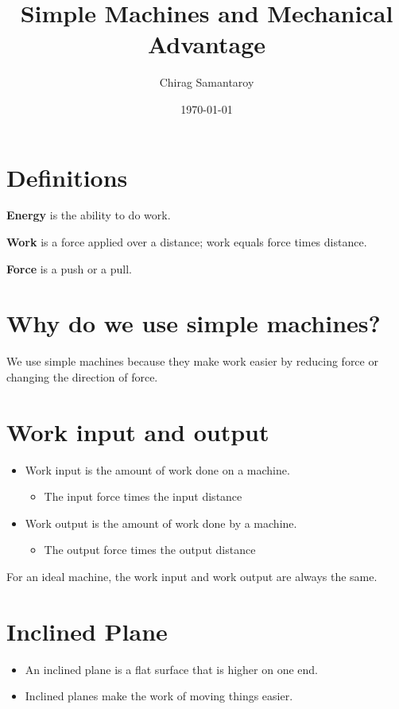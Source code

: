 \documentclass[12pt]{scrartcl}
\title{Simple Machines and Mechanical Advantage}
\author{Chirag Samantaroy}
\date{\today}
\begin{document}
\maketitle

\tableofcontents

\pagebreak

\section{Definitions}
\begin{defn}[Energy]
\textbf{Energy} is the ability to do work. 
\end{defn}
\begin{defn}[Work]
\textbf{Work} is a force applied over a distance; work equals force times distance.
\end{defn}
\begin{defn}[Force]
\textbf{Force} is a push or a pull.
\end{defn}
\section{Why do we use simple machines?}
We use simple machines because they make work easier by reducing force or changing the direction of force.
\section{Work input and output}
\begin{itemize}
    \item Work input is the amount of work done on a machine.
    \begin{itemize}
        \item The input force times the input distance
    \end{itemize}
    \item Work output is the amount of work done by a machine.
    \begin{itemize}
        \item The output force times the output distance
    \end{itemize}
\end{itemize}
For an ideal machine, the work input and work output are always the same.
\section{Inclined Plane}
\begin{itemize}
    \item An inclined plane is a flat surface that is higher on one end.
    \item Inclined planes make the work of moving things easier.
\end{itemize}
\end{document}
